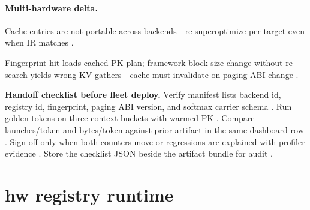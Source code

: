 \paragraph{Multi-hardware delta.} Cache entries are not portable across backends---re-superoptimize per target even when IR matches \citep{yirage2026,chen2020compilerbasedhardw,amd2024xdna,amd2024aie,patel2025llminference,taxbreak2026,memoryfloor2026,dlbook,semianalysis2024tma,kwon2023vllm,liu2024deepseekv3,nvidia2024cudagraphs,dao2022flashattention,dao2023flashdecoding,nvidia2022hopper,dlbook}.

\begin{example}
Fingerprint hit loads cached PK plan; framework block size change without re-search yields wrong KV gathers---cache must invalidate on paging ABI change \citep{kwon2023vllm,yirage2026,chen2020compilerbasedhardw,patel2025llminference,memoryfloor2026,taxbreak2026,dao2022flashattention,dlbook}.
\end{example}

\textbf{Handoff checklist before fleet deploy.} Verify manifest lists backend id, registry id, fingerprint, paging ABI version, and softmax carrier schema \citep{yirage2026,chen2020compilerbasedhardw,dao2022flashattention,kwon2023vllm,patel2025llminference,dlbook}. Run golden tokens on three context buckets with warmed PK \citep{patel2025llminference,yirage2026,chen2020compilerbasedhardw,memoryfloor2026,taxbreak2026,dlbook}. Compare launches/token and bytes/token against prior artifact in the same dashboard row \citep{taxbreak2026,memoryfloor2026,patel2025llminference,yirage2026,chen2020compilerbasedhardw,kwon2023vllm,dlbook}. Sign off only when both counters move or regressions are explained with profiler evidence \citep{patel2025llminference,memoryfloor2026,yirage2026,chen2020compilerbasedhardw,taxbreak2026,dlbook}. Store the checklist JSON beside the artifact bundle for audit \citep{yirage2026,chen2020compilerbasedhardw,patel2025llminference,dlbook}.

\section{hw registry runtime}
\label{sec:ch29_hw_registry_runtime}

